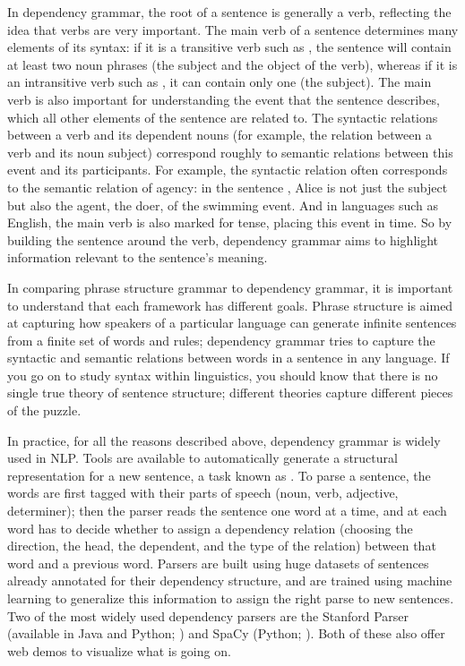 In dependency grammar, the root of a sentence is generally a verb, reflecting the idea that verbs are very important.  The main verb of a sentence determines many elements of its syntax: if it  is a transitive verb such as , the sentence will contain at least two noun phrases (the subject and the object of the verb), whereas if it is an intransitive verb such as , it can contain only one (the subject).  The main verb is also important for understanding the event that the sentence describes, which all other elements of the sentence are related to.   The syntactic relations between a verb and its dependent nouns (for example, the  relation between a verb and its noun subject)  correspond roughly to semantic relations between this event and its  participants.  For example, the syntactic  relation  often corresponds to the semantic relation of agency: in the sentence , Alice is not just the subject but also the agent, the doer, of the swimming event.  And in languages such as English, the main verb is also marked for tense, placing this event in time.   So by building the sentence around the verb, dependency grammar aims to highlight information relevant to the sentence's meaning.

In comparing phrase structure grammar to dependency grammar, it is important to understand that each framework has different goals.  Phrase structure is aimed at capturing how speakers of a particular language can generate infinite sentences from a finite set of words and rules; dependency grammar tries to capture the syntactic and semantic relations between words in a sentence in any language.  If you go on to study syntax within linguistics, you should know that there is no single true theory of sentence structure; different theories capture different pieces of the puzzle.

In practice, for all the reasons described above, dependency grammar is widely used in NLP.  Tools are available to automatically generate a structural representation for a new sentence, a task known as .  To parse a sentence, the words are first tagged with their parts of speech (noun, verb, adjective, determiner); then the parser reads the sentence one word at a time, and at each word has to decide whether to assign a dependency relation (choosing the direction, the head, the dependent, and the type of the relation) between that word and a previous word.  Parsers are built using huge datasets of sentences already annotated for their dependency structure, and are trained using machine learning to generalize this information to assign the right parse to new sentences.  Two of the most widely used dependency parsers are the Stanford  Parser (available in Java and Python; \citealt{deMarneffe-etal:2006}) and SpaCy (Python; \citealt{HonnibalJohnson:2015}).  Both of these also offer web demos to visualize what is going on.

